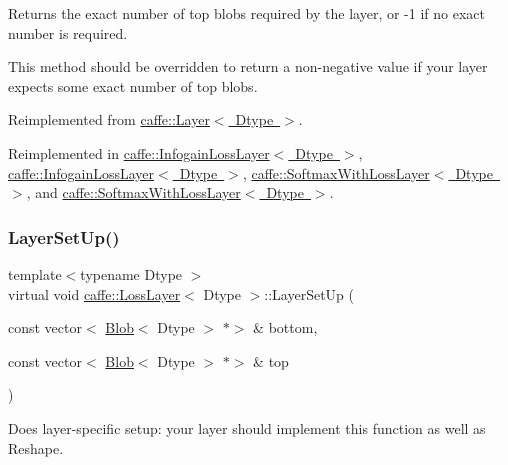 Returns the exact number of top blobs required by the layer, or -\/1 if no exact number is required. 

This method should be overridden to return a non-\/negative value if your layer expects some exact number of top blobs. 

Reimplemented from \mbox{\hyperlink{classcaffe_1_1_layer_a64e2ca72c719e4b2f1f9216ccfb0d37f}{caffe\+::\+Layer$<$ Dtype $>$}}.



Reimplemented in \mbox{\hyperlink{classcaffe_1_1_infogain_loss_layer_aaf55e75f2296586b1fee0175e2d72fbb}{caffe\+::\+Infogain\+Loss\+Layer$<$ Dtype $>$}}, \mbox{\hyperlink{classcaffe_1_1_infogain_loss_layer_aaf55e75f2296586b1fee0175e2d72fbb}{caffe\+::\+Infogain\+Loss\+Layer$<$ Dtype $>$}}, \mbox{\hyperlink{classcaffe_1_1_softmax_with_loss_layer_a9035d000b2ce51a973f255a5eb2df8e3}{caffe\+::\+Softmax\+With\+Loss\+Layer$<$ Dtype $>$}}, and \mbox{\hyperlink{classcaffe_1_1_softmax_with_loss_layer_a9035d000b2ce51a973f255a5eb2df8e3}{caffe\+::\+Softmax\+With\+Loss\+Layer$<$ Dtype $>$}}.

\mbox{\label{classcaffe_1_1_loss_layer_a479314172e8fbe1485f59537c1fba222}} 
\subsubsection{\texorpdfstring{Layer\+Set\+Up()}{LayerSetUp()}\hspace{0.1cm}{\footnotesize\ttfamily [1/2]}}
{\footnotesize\ttfamily template$<$typename Dtype $>$ \\
virtual void \mbox{\hyperlink{classcaffe_1_1_loss_layer}{caffe\+::\+Loss\+Layer}}$<$ Dtype $>$\+::Layer\+Set\+Up (\begin{DoxyParamCaption}\item[{const vector$<$ \mbox{\hyperlink{classcaffe_1_1_blob}{Blob}}$<$ Dtype $>$ $\ast$$>$ \&}]{bottom,  }\item[{const vector$<$ \mbox{\hyperlink{classcaffe_1_1_blob}{Blob}}$<$ Dtype $>$ $\ast$$>$ \&}]{top }\end{DoxyParamCaption})\hspace{0.3cm}{\ttfamily [virtual]}}



Does layer-\/specific setup\+: your layer should implement this function as well as Reshape. 


